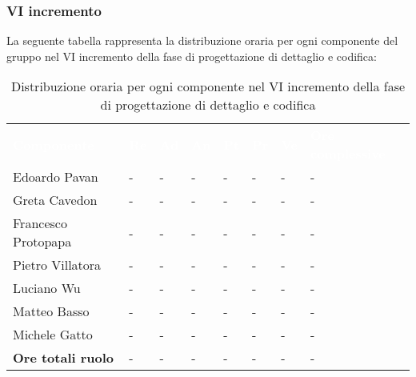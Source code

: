 \subsubsection{VI incremento}
La seguente tabella rappresenta la distribuzione oraria per ogni componente del gruppo nel VI incremento della fase di progettazione di dettaglio e codifica:
\begin{table}[!htbp]
\begin{center}
\renewcommand{\arraystretch}{1.25}
\begin{tabular}{ m{}<{\centering}  m{}<{\centering} m{}<{\centering} m{}<{\centering}  m{}<{\centering}  m{}<{\centering}  m{}<{\centering}  m{}<{\centering}   }
	\rowcolor{darkblue}
	\textcolor{white}{\textbf{Componente}} &\textcolor{white}{\textbf{Re}}&\textcolor{white}{\textbf{Ad}}&\textcolor{white}{\textbf{An}}&\textcolor{white}{\textbf{Pt}}&\textcolor{white}{\textbf{Pr}}&\textcolor{white}{\textbf{Ve}}&\textcolor{white}{\textbf{Ore complessive}}\\ 

	Edoardo Pavan & - & - & - & - & - & - & -\\	

	Greta Cavedon & - & - & - & - & - & - & -\\
	
	Francesco Protopapa & - & - & - & - & - & - & -\\
	
	Pietro Villatora & - & - & - & - & - & - & -\\
	
	Luciano Wu & - & - & - & - & - & - & -\\
	
	Matteo Basso & - & - & - & - & - & - & -\\
	
	Michele Gatto & - & - & - & - & - & - & -\\
	
	\textbf{Ore totali ruolo} & - & - & - & - & - & - & -\\

\end{tabular}
\caption{Distribuzione oraria per ogni componente nel VI incremento della fase di progettazione di dettaglio e codifica}
\end{center}
\end{table}


